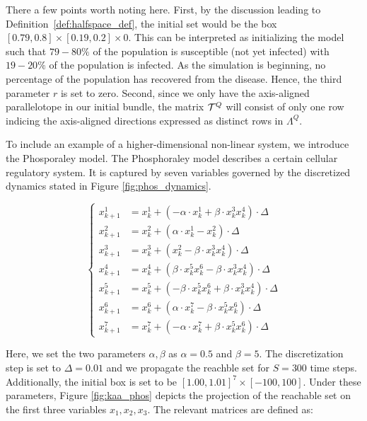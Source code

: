 \begin{example}
  There a few points worth noting here. First, by the discussion leading to Definition~\ref{def:halfspace_def}, the initial set would be the box $[0.79,0.8] \times [0.19, 0.2] \times 0$. This can be interpreted as initializing the model such that $79-80\%$ of the population is susceptible (not yet infected) with $19-20\%$ of the population is infected. As the simulation is beginning, no percentage of the population has recovered from the disease. Hence, the third parameter $r$ is set to zero.
  Second, since we only have the axis-aligned parallelotope in our initial bundle, the matrix $\mathcal{T}^Q$ will consist of only one row indicing the axis-aligned directions expressed as distinct rows in $\Lambda^Q$.
\end{example}

\begin{example}
\label{ex:phos}
To include an example of a higher-dimensional non-linear system, we introduce the Phosporaley model. The Phosphoraley model describes a certain cellular regulatory system. It is captured by seven variables governed by the discretized dynamics stated in Figure \ref{fig:phos_dynamics}.

\begin{center}
  \begin{equation*}
    \begin{cases}
        x^1_{k+1} &= x^1_k + ( -\alpha \cdot x^1_k + \beta \cdot x^3_k x^4_k)\cdot \Delta \\
        x^2_{k+1} &= x^2_k + (  \alpha\cdot  x^1_k - x^2_k)\cdot \Delta \\
        x^3_{k+1} &= x^3_k + ( x^2_k - \beta \cdot x^3_k x^4_k)\cdot \Delta \\
        x^4_{k+1} &= x^4_k + ( \beta \cdot x^5_k x^6_k - \beta \cdot x^3_k x^4_k)\cdot \Delta \\
        x^5_{k+1} &= x^5_k + ( -\beta \cdot x^5_k x^6_k + \beta \cdot x^3_k x^4_k)\cdot \Delta \\
        x^6_{k+1} &= x^6_k + ( \alpha\cdot  x^7_k - \beta \cdot x^5_k x^6_k)\cdot \Delta \\
        x^7_{k+1} &= x^7_k + ( -\alpha\cdot  x^7_k + \beta \cdot  x^5_k x^6_k)\cdot \Delta
    \end{cases}
  \end{equation*}
  \label{fig:phos_dynamics}
\end{center}
%
Here, we set the two parameters $\alpha,\beta$ as $\alpha=0.5$ and $\beta=5$. The discretization step is set to $\Delta =0.01$ and we propagate the reachble set for $S=300$ time steps. Additionally, the initial box is set to be $[1.00,1.01]^7 \times [-100, 100]$. Under these parameters, Figure \ref{fig:kaa_phos} depicts the projection of the reachable set on the first three variables $x_1, x_2, x_3$. The relevant matrices are defined as:


\end{example}
